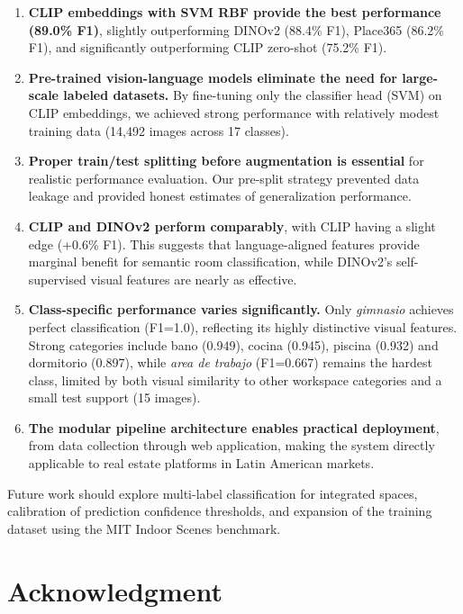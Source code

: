 \documentclass[conference]{IEEEtran}
\begin{document}
\begin{enumerate}
\item \textbf{CLIP embeddings with SVM RBF provide the best performance (89.0\% F1)}, slightly outperforming DINOv2 (88.4\% F1), Place365 (86.2\% F1), and significantly outperforming CLIP zero-shot (75.2\% F1).

\item \textbf{Pre-trained vision-language models eliminate the need for large-scale labeled datasets.} By fine-tuning only the classifier head (SVM) on CLIP embeddings, we achieved strong performance with relatively modest training data (14,492 images across 17 classes).

\item \textbf{Proper train/test splitting before augmentation is essential} for realistic performance evaluation. Our pre-split strategy prevented data leakage and provided honest estimates of generalization performance.

\item \textbf{CLIP and DINOv2 perform comparably}, with CLIP having a slight edge (+0.6\% F1). This suggests that language-aligned features provide marginal benefit for semantic room classification, while DINOv2's self-supervised visual features are nearly as effective.

\item \textbf{Class-specific performance varies significantly.} Only \textit{gimnasio} achieves perfect classification (F1=1.0), reflecting its highly distinctive visual features. Strong categories include bano (0.949), cocina (0.945), piscina (0.932) and dormitorio (0.897), while \textit{area de trabajo} (F1=0.667) remains the hardest class, limited by both visual similarity to other workspace categories and a small test support (15 images).

\item \textbf{The modular pipeline architecture enables practical deployment}, from data collection through web application, making the system directly applicable to real estate platforms in Latin American markets.
\end{enumerate}

Future work should explore multi-label classification for integrated spaces, calibration of prediction confidence thresholds, and expansion of the training dataset using the MIT Indoor Scenes benchmark.

\section*{Acknowledgment}
\end{document}
